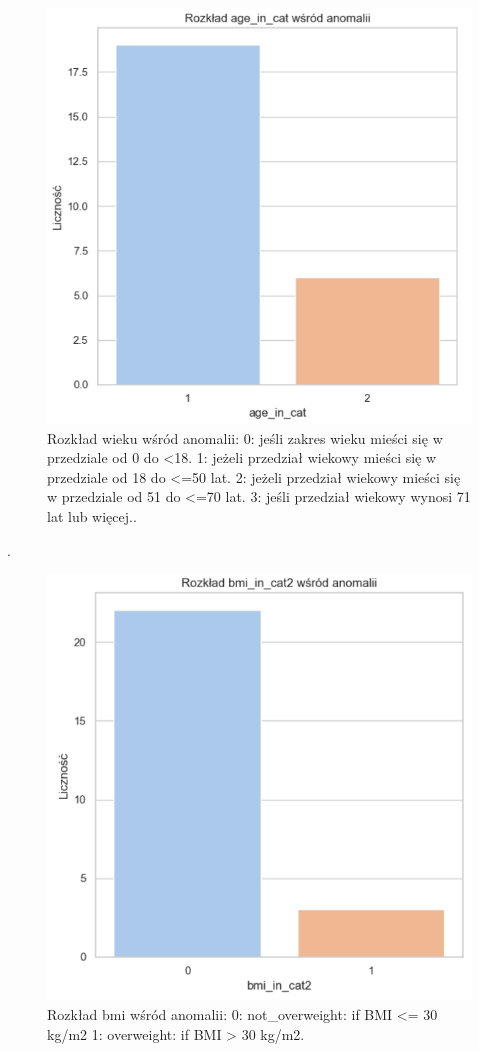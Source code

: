 \documentclass[a4paper,fleqn]{cas-dc}
\begin{document}
\begin{figure}[h]
	\includegraphics[scale=.46]{wykresy/wykres6.png}
	\caption{Rozkład wieku wśród anomalii: 0: jeśli zakres wieku mieści się w przedziale od 0 do <18. 
1: jeżeli przedział wiekowy mieści się w przedziale od 18 do <=50 lat.
2: jeżeli przedział wiekowy mieści się w przedziale od 51 do <=70 lat.
3: jeśli przedział wiekowy wynosi 71 lat lub więcej..}
	\label{FIG:1}
\end{figure}
\newpage
.
\newpage
\begin{figure}[h]
	\includegraphics[scale=.57]{wykresy/wykres7.png}
	\caption{Rozkład bmi wśród anomalii: 0: not\_overweight: if BMI <= 30 kg/m2 
1: overweight: if BMI > 30 kg/m2.}
	\label{FIG:1}
\end{figure}
\end{document}
